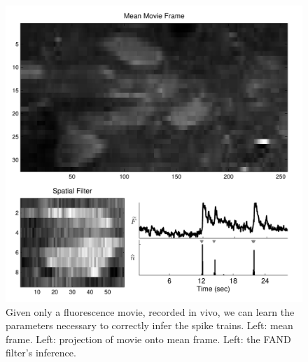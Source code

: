 
\begin{figure}[H]
\centering \includegraphics[width=.9\linewidth]{../figs/spatial_data}
\caption{Given only a fluorescence movie, recorded in vivo, we can learn the parameters necessary to correctly infer the spike trains. Left: mean frame.  Left: projection of movie onto mean frame. Left: the FAND filter's inference.} \label{fig:spatial_data}
\end{figure}



